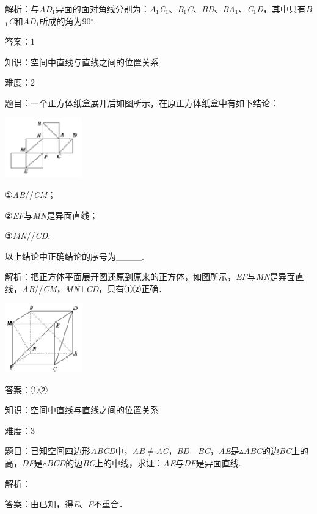 \documentclass{article} %
\begin{document}
解析：与\textit{AD}${}_{1}$异面的面对角线分别为：\textit{A}${}_{1}$\textit{C}${}_{1}$、\textit{B}${}_{1}$\textit{C}、\textit{BD}、\textit{BA}${}_{1}$、\textit{C}${}_{1}$\textit{D}，其中只有\textit{B}${}_{1}$\textit{C}和\textit{AD}${}_{1}$所成的角为90$\mathrm{{}^\circ}$.

答案：1

知识：空间中直线与直线之间的位置关系

难度：2

题目：一个正方体纸盒展开后如图所示，在原正方体纸盒中有如下结论：

\includegraphics*[width=1.31in, height=1.02in, keepaspectratio=false]{image114}

①\textit{AB}//\textit{CM}；

②\textit{EF}与\textit{MN}是异面直线；

③\textit{MN}//\textit{CD}.

以上结论中正确结论的序号为\_\_\_\_.

解析：把正方体平面展开图还原到原来的正方体，如图所示，\textit{EF}与\textit{MN}是异面直线，\textit{AB}//\textit{CM}，\textit{MN}$\mathrm{\bot}$\textit{CD}，只有①②正确．

\includegraphics*[width=1.32in, height=1.17in, keepaspectratio=false]{image115}

答案：①②

知识：空间中直线与直线之间的位置关系

难度：3

题目：已知空间四边形\textit{ABCD}中，\textit{AB}$\mathrm{\neq}$\textit{AC}，\textit{BD}＝\textit{BC}，\textit{AE}是$\mathrm{\vartriangle}$\textit{ABC}的边\textit{BC}上的高，\textit{DF}是$\mathrm{\vartriangle}$\textit{BCD}的边\textit{BC}上的中线，求证：\textit{AE}与\textit{DF}是异面直线.

解析：

答案：由已知，得\textit{E}、\textit{F}不重合．
\end{document}
